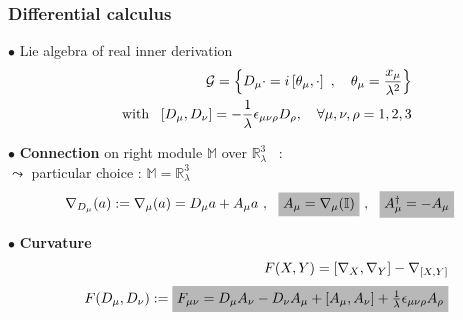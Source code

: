 \documentclass[9pt]{beamer}
\begin{document}
\begin{frame}

\frametitle{Differential calculus}

\vfill

$\bullet$ Lie algebra of real inner derivation
\vspace*{-2pt}
\begin{eqnarray*}
&& \mathcal{G} = \left\{ D_\mu \cdot = i \left[ \theta_\mu , \cdot \right] \ , \quad \theta_\mu = \frac{x_\mu}{\lambda^2} \right\} \\
&& \mbox{with } \ \left[ D_\mu , D_\nu \right] = - \frac{1}{\lambda} \epsilon_{\mu\nu\rho} D_\rho  , \quad \forall \mu, \nu, \rho = 1, 2, 3 
\vspace*{-2pt}
\end{eqnarray*}

\vfill

$\bullet$ \textbf{Connection} on right module $\mathbb{M}$ over $\mathbb{R}^3_\lambda$ \ : \quad {}\\[2pt]
\quad \textdbend \quad $\leadsto$ \quad particular choice : $\mathbb{M} = \mathbb{R}^3_\lambda$
\vspace*{-2pt}
\begin{eqnarray*}
\nabla_{D_\mu}(a) :=  \nabla_\mu(a) = D_\mu a + A_\mu a \ , \ \ 
\tikz[baseline]{\node[fill=black!28!white,anchor=base] (t1) {$A_\mu = \nabla_\mu(\mathbb{I})$};}
 \ , \ \
\tikz[baseline]{\node[fill=black!28!white,anchor=base] (t1) {$A_\mu^\dagger = - A_\mu$};}
\vspace*{-2pt}
\end{eqnarray*}

\vfill

$\bullet$ \textbf{Curvature}
\vspace*{-2pt}
\begin{eqnarray*}
&& F(X,Y) = \left[\nabla_X , \nabla_Y\right] - \nabla_{[X,Y]} \\[2pt]
&& F(D_\mu,D_\nu) := \tikz[baseline]{\node[fill=black!28!white,anchor=base] (t1) {$F_{\mu\nu} = D_\mu A_\nu - D_\nu A_\mu + \left[A_\mu , A_\nu\right] + \frac{1}{\lambda} \epsilon_{\mu\nu\rho} A_\rho$};}
\end{eqnarray*}

\vfill

\end{frame}

\end{document}
